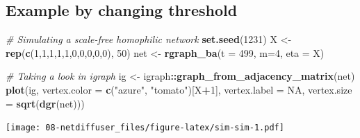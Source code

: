 \documentclass[]{book}
\newenvironment{Shaded}{\begin{snugshade}}{\end{snugshade}}
\newcommand{\CommentTok}[1]{\textcolor[rgb]{0.56,0.35,0.01}{\textit{#1}}}
\newcommand{\DataTypeTok}[1]{\textcolor[rgb]{0.13,0.29,0.53}{#1}}
\newcommand{\DecValTok}[1]{\textcolor[rgb]{0.00,0.00,0.81}{#1}}
\newcommand{\KeywordTok}[1]{\textcolor[rgb]{0.13,0.29,0.53}{\textbf{#1}}}
\newcommand{\NormalTok}[1]{#1}
\newcommand{\OperatorTok}[1]{\textcolor[rgb]{0.81,0.36,0.00}{\textbf{#1}}}
\newcommand{\OtherTok}[1]{\textcolor[rgb]{0.56,0.35,0.01}{#1}}
\newcommand{\StringTok}[1]{\textcolor[rgb]{0.31,0.60,0.02}{#1}}
\begin{document}
\hypertarget{example-by-changing-threshold}{%
\subsection{Example by changing threshold}\label{example-by-changing-threshold}}

\begin{Shaded}
\begin{Highlighting}[]

\CommentTok{# Simulating a scale-free homophilic network}
\KeywordTok{set.seed}\NormalTok{(}\DecValTok{1231}\NormalTok{)}
\NormalTok{X <-}\StringTok{ }\KeywordTok{rep}\NormalTok{(}\KeywordTok{c}\NormalTok{(}\DecValTok{1}\NormalTok{,}\DecValTok{1}\NormalTok{,}\DecValTok{1}\NormalTok{,}\DecValTok{1}\NormalTok{,}\DecValTok{1}\NormalTok{,}\DecValTok{0}\NormalTok{,}\DecValTok{0}\NormalTok{,}\DecValTok{0}\NormalTok{,}\DecValTok{0}\NormalTok{,}\DecValTok{0}\NormalTok{), }\DecValTok{50}\NormalTok{)}
\NormalTok{net <-}\StringTok{ }\KeywordTok{rgraph_ba}\NormalTok{(}\DataTypeTok{t =} \DecValTok{499}\NormalTok{, }\DataTypeTok{m=}\DecValTok{4}\NormalTok{, }\DataTypeTok{eta =}\NormalTok{ X)}

\CommentTok{# Taking a look in igraph}
\NormalTok{ig  <-}\StringTok{ }\NormalTok{igraph}\OperatorTok{::}\KeywordTok{graph_from_adjacency_matrix}\NormalTok{(net)}
\KeywordTok{plot}\NormalTok{(ig, }\DataTypeTok{vertex.color =} \KeywordTok{c}\NormalTok{(}\StringTok{"azure"}\NormalTok{, }\StringTok{"tomato"}\NormalTok{)[X}\OperatorTok{+}\DecValTok{1}\NormalTok{], }\DataTypeTok{vertex.label =} \OtherTok{NA}\NormalTok{,}
     \DataTypeTok{vertex.size =} \KeywordTok{sqrt}\NormalTok{(}\KeywordTok{dgr}\NormalTok{(net)))}
\end{Highlighting}
\end{Shaded}

\texttt{[image: 08-netdiffuser\_files/figure-latex/sim-sim-1.pdf]}
\end{document}
